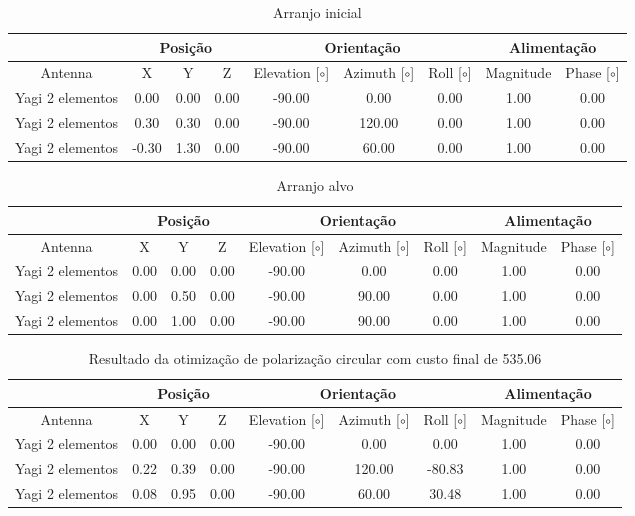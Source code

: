 \begin{table}[H]
    \centering
    \tiny
    \begin{tabular}{c|c|c|c|c|c|c|c|c}
         & \multicolumn{3}{|c|}{Posição} & \multicolumn{3}{|c|}{Orientação} & \multicolumn{2}{|c}{Alimentação} \\
         \hline
        Antenna & X & Y & Z & Elevation [$\circ$] & Azimuth [$\circ$] & Roll [$\circ$] & Magnitude & Phase [$\circ$] \\
        \hline
        Yagi 2 elementos & 0.00 & 0.00 & 0.00 & -90.00 & 0.00 & 0.00 & 1.00 & 0.00 \\
        Yagi 2 elementos & 0.30 & 0.30 & 0.00 & -90.00 & 120.00 & 0.00 & 1.00 & 0.00 \\
        Yagi 2 elementos & -0.30 & 1.30 & 0.00 & -90.00 & 60.00 & 0.00 & 1.00 & 0.00 \\
    \end{tabular}
    \caption{Arranjo inicial}
    \label{tab:Arranjo Arranjo inicial - otimização circular}
\end{table}
\begin{table}[H]
    \centering
    \tiny
    \begin{tabular}{c|c|c|c|c|c|c|c|c}
         & \multicolumn{3}{|c|}{Posição} & \multicolumn{3}{|c|}{Orientação} & \multicolumn{2}{|c}{Alimentação} \\
         \hline
        Antenna & X & Y & Z & Elevation [$\circ$] & Azimuth [$\circ$] & Roll [$\circ$] & Magnitude & Phase [$\circ$] \\
        \hline
        Yagi 2 elementos & 0.00 & 0.00 & 0.00 & -90.00 & 0.00 & 0.00 & 1.00 & 0.00 \\
        Yagi 2 elementos & 0.00 & 0.50 & 0.00 & -90.00 & 90.00 & 0.00 & 1.00 & 0.00 \\
        Yagi 2 elementos & 0.00 & 1.00 & 0.00 & -90.00 & 90.00 & 0.00 & 1.00 & 0.00 \\
    \end{tabular}
    \caption{Arranjo alvo}
    \label{tab:Arranjo Arranjo alvo de polarização circular - otimização circular}
\end{table}
\begin{table}[H]
    \centering
    \tiny
    \begin{tabular}{c|c|c|c|c|c|c|c|c}
         & \multicolumn{3}{|c|}{Posição} & \multicolumn{3}{|c|}{Orientação} & \multicolumn{2}{|c}{Alimentação} \\
         \hline
        Antenna & X & Y & Z & Elevation [$\circ$] & Azimuth [$\circ$] & Roll [$\circ$] & Magnitude & Phase [$\circ$] \\
        \hline
        Yagi 2 elementos & 0.00 & 0.00 & 0.00 & -90.00 & 0.00 & 0.00 & 1.00 & 0.00 \\
        Yagi 2 elementos & 0.22 & 0.39 & 0.00 & -90.00 & 120.00 & -80.83 & 1.00 & 0.00 \\
        Yagi 2 elementos & 0.08 & 0.95 & 0.00 & -90.00 & 60.00 & 30.48 & 1.00 & 0.00 \\
    \end{tabular}
    \caption{Resultado da otimização de polarização circular com custo final de 535.06}
    \label{tab:Arranjo Arranjo final otimizado - otimização circular}
\end{table}
